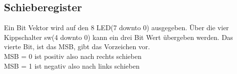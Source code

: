 \subsection{Schieberegister}
Ein Bit Vektor wird auf den 8 LED(7 downto 0) ausgegeben. Über die vier 
Kippschalter sw(4 downto 0) kann ein drei Bit Wert übergeben werden. Das 
vierte Bit, ist das MSB, gibt das Vorzeichen vor. \\
MSB = 0 ist positiv also nach rechts schieben \\
MSB = 1 ist negativ also nach links schieben


